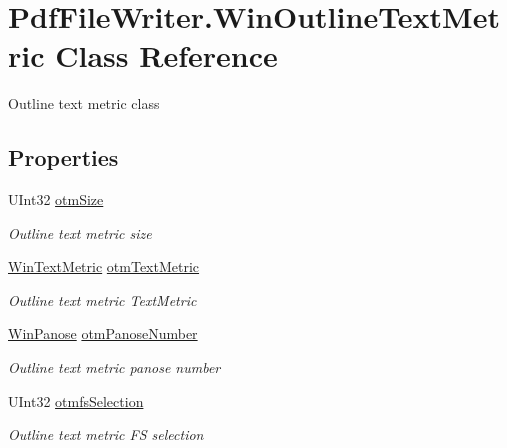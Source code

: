 \hypertarget{class_pdf_file_writer_1_1_win_outline_text_metric}{}\section{Pdf\+File\+Writer.\+Win\+Outline\+Text\+Metric Class Reference}
\label{class_pdf_file_writer_1_1_win_outline_text_metric}


Outline text metric class  


\subsection*{Properties}
\begin{DoxyCompactItemize}
\item 
U\+Int32 \hyperlink{class_pdf_file_writer_1_1_win_outline_text_metric_ab408b6c5d521ab2bb8a9233cf413341b}{otm\+Size}
\begin{DoxyCompactList}\small\item\em Outline text metric size \end{DoxyCompactList}\item 
\hyperlink{class_pdf_file_writer_1_1_win_text_metric}{Win\+Text\+Metric} \hyperlink{class_pdf_file_writer_1_1_win_outline_text_metric_aba603bebf4c52b4b561eebfb98019dbe}{otm\+Text\+Metric}
\begin{DoxyCompactList}\small\item\em Outline text metric Text\+Metric \end{DoxyCompactList}\item 
\hyperlink{class_pdf_file_writer_1_1_win_panose}{Win\+Panose} \hyperlink{class_pdf_file_writer_1_1_win_outline_text_metric_a1ca5f057f0398b517ed6196b95569a19}{otm\+Panose\+Number}
\begin{DoxyCompactList}\small\item\em Outline text metric panose number \end{DoxyCompactList}\item 
U\+Int32 \hyperlink{class_pdf_file_writer_1_1_win_outline_text_metric_abbbbcfadfaa50e7c23fea1915389ed59}{otmfs\+Selection}
\begin{DoxyCompactList}\small\item\em Outline text metric FS selection \end{DoxyCompactList}\item 

\end{DoxyCompactItemize}
